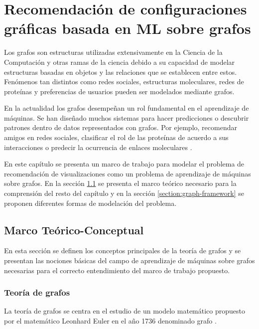 \chapter{Recomendaci\'on de configuraciones gr\'aficas basada en ML sobre grafos}\label{chapter:ml-on-graphs}

Los grafos son estructuras utilizadas extensivamente en la Ciencia de la Computaci\'on y otras
ramas de la ciencia debido a su capacidad de modelar estructuras basadas
en objetos y las relaciones que se establecen entre estos. Fen\'omenos
tan distintos como redes sociales, estructuras moleculares, redes de prote\'inas y
preferencias de usuarios pueden ser modelados mediante grafos.

En la actualidad los grafos desempe\~nan un rol fundamental en el
aprendizaje de m\'aquinas. Se han dise\~nado muchos sistemas para hacer predicciones o descubrir patrones dentro
de datos representados con grafos. Por ejemplo, recomendar amigos en
redes sociales, clasificar el rol de las prote\'inas de acuerdo a sus interacciones
o predecir la ocurrencia de enlaces moleculares \cite{hamilton2017representation}.

En este cap\'itulo se presenta un marco de trabajo para modelar
el problema de recomendaci\'on de visualizaciones como un problema
de aprendizaje de m\'aquinas sobre grafos. En la secci\'on \ref{section:theoretical-framework}
se presenta el marco te\'orico necesario para la comprensi\'on del
resto del cap\'itulo y en la secci\'on \ref{section:graph-framework} se proponen
diferentes formas de modelaci\'on del problema. 


\section{Marco Te\'orico-Conceptual}\label{section:theoretical-framework}

En esta secci\'on se definen los conceptos principales de la teor\'ia de grafos
y se presentan las nociones b\'asicas del campo de aprendizaje de m\'aquinas
sobre grafos necesarias para el correcto entendimiento del marco de trabajo propuesto.

\subsection{Teor\'ia de grafos}

La teor\'ia de grafos se centra en el estudio de un modelo
matem\'atico propuesto por el matem\'atico Leonhard Euler en el
a\~no 1736 denominado grafo \cite{estrada2012structure}.

